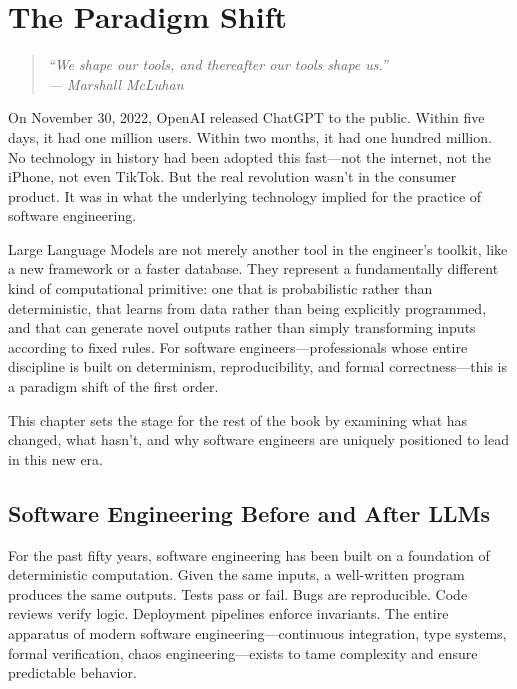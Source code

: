 \chapter{The Paradigm Shift}
\label{ch:paradigm-shift}

\begin{quote}
\itshape
``We shape our tools, and thereafter our tools shape us.''\\
--- Marshall McLuhan
\end{quote}

\vspace{0.5cm}

\noindent
On November 30, 2022, OpenAI released ChatGPT to the public. Within five days, it had one million users. Within two months, it had one hundred million. No technology in history had been adopted this fast---not the internet, not the iPhone, not even TikTok. But the real revolution wasn't in the consumer product. It was in what the underlying technology implied for the practice of software engineering.

Large Language Models are not merely another tool in the engineer's toolkit, like a new framework or a faster database. They represent a fundamentally different kind of computational primitive: one that is probabilistic rather than deterministic, that learns from data rather than being explicitly programmed, and that can generate novel outputs rather than simply transforming inputs according to fixed rules. For software engineers---professionals whose entire discipline is built on determinism, reproducibility, and formal correctness---this is a paradigm shift of the first order.

This chapter sets the stage for the rest of the book by examining what has changed, what hasn't, and why software engineers are uniquely positioned to lead in this new era.

\section{Software Engineering Before and After LLMs}

For the past fifty years, software engineering has been built on a foundation of deterministic computation. Given the same inputs, a well-written program produces the same outputs. Tests pass or fail. Bugs are reproducible. Code reviews verify logic. Deployment pipelines enforce invariants. The entire apparatus of modern software engineering---continuous integration, type systems, formal verification, chaos engineering---exists to tame complexity and ensure predictable behavior.

